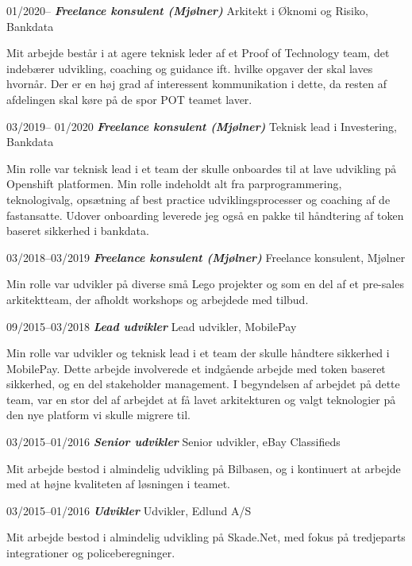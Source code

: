 \documentclass[10pt,a4,sans]{article}
\begin{document}
\begin{CV}
    \item[01/2020--] \textbf{\emph{Freelance konsulent (Mjølner)}} Arkitekt i Øknomi og Risiko, Bankdata
    
Mit arbejde består i at agere teknisk leder af et Proof of Technology team, det indebærer udvikling, coaching og guidance ift. hvilke opgaver der skal laves hvornår. Der er en høj grad af interessent kommunikation i dette, da resten af afdelingen skal køre på de spor POT teamet laver.
 
    \item[03/2019-- 01/2020] \textbf{\emph{Freelance konsulent (Mjølner)}} Teknisk lead i Investering, Bankdata
    
Min rolle var teknisk lead i et team der skulle onboardes til at lave udvikling på Openshift platformen. Min rolle indeholdt alt fra parprogrammering, teknologivalg, opsætning af best practice udviklingsprocesser og coaching af de fastansatte. Udover onboarding leverede jeg også en pakke til håndtering af token baseret sikkerhed i bankdata.

    \item[03/2018--03/2019] \textbf{\emph{Freelance konsulent (Mjølner)}} Freelance konsulent, Mjølner
    
Min rolle var udvikler på diverse små Lego projekter og som en del af et pre-sales arkitektteam, der afholdt workshops og arbejdede med tilbud.
 
    \item[09/2015--03/2018] \textbf{\emph{Lead udvikler}} Lead udvikler, MobilePay 

Min rolle var udvikler og teknisk lead i et team der skulle håndtere sikkerhed i MobilePay. Dette arbejde involverede et indgående arbejde med token baseret sikkerhed, og en del stakeholder management. I begyndelsen af arbejdet på dette team, var en stor del af arbejdet at få lavet arkitekturen og valgt teknologier på den nye platform vi skulle migrere til.

    \item[03/2015--01/2016] \textbf{\emph{Senior udvikler}} Senior udvikler, eBay Classifieds 
    
    Mit arbejde bestod i almindelig udvikling på Bilbasen, og i kontinuert at arbejde med at højne kvaliteten  af løsningen i teamet.

    \item[03/2015--01/2016] \textbf{\emph{Udvikler}} Udvikler, Edlund A/S 
    
    Mit arbejde bestod i almindelig udvikling på Skade.Net, med fokus på tredjeparts integrationer og policeberegninger.
    
\end{CV}
\end{document}
